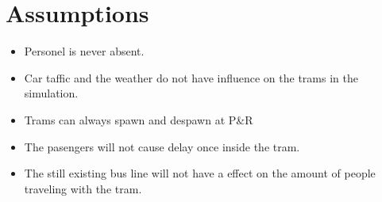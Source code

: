 \section{Assumptions}

\begin{itemize}
	\item Personel is never absent.
	
	\item Car taffic and the weather do not have influence on the trams in 
	the simulation.
	
	\item Trams can always spawn and despawn at P\&R
	
	\item The pasengers will not cause delay once inside the tram.
	
	\item The still existing bus line will not have a effect on the amount of 
	people traveling with the tram. 
	
\end{itemize}
